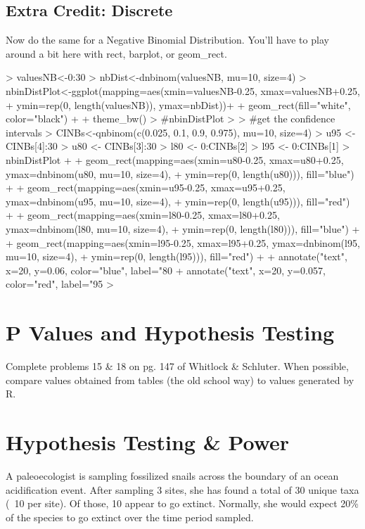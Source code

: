 \documentclass{article}
\begin{document}
\subsection{Extra Credit: Discrete}
Now do the same for a Negative Binomial Distribution.  You'll have to play around a bit here with rect, barplot, or geom\_rect.
\begin{Schunk}
\begin{Sinput}
> valuesNB<-0:30
> nbDist<-dnbinom(valuesNB, mu=10, size=4)
> nbinDistPlot<-ggplot(mapping=aes(xmin=valuesNB-0.25, xmax=valuesNB+0.25,
+                                  ymin=rep(0, length(valuesNB)), ymax=nbDist))+
+                    geom_rect(fill="white", color="black") +
+                     theme_bw()
> #nbinDistPlot
> 
> #get the confidence intervals
> CINBs<-qnbinom(c(0.025, 0.1, 0.9, 0.975), mu=10, size=4)
> u95 <- CINBs[4]:30
> u80 <- CINBs[3]:30
> l80 <- 0:CINBs[2]
> l95 <- 0:CINBs[1]
> nbinDistPlot +
+             geom_rect(mapping=aes(xmin=u80-0.25, xmax=u80+0.25, ymax=dnbinom(u80, mu=10, size=4),
+                                   ymin=rep(0, length(u80))), fill="blue") +
+             geom_rect(mapping=aes(xmin=u95-0.25, xmax=u95+0.25, ymax=dnbinom(u95, mu=10, size=4),
+                                   ymin=rep(0, length(u95))), fill="red") +
+             geom_rect(mapping=aes(xmin=l80-0.25, xmax=l80+0.25, ymax=dnbinom(l80, mu=10, size=4),
+                                   ymin=rep(0, length(l80))), fill="blue") +
+             geom_rect(mapping=aes(xmin=l95-0.25, xmax=l95+0.25, ymax=dnbinom(l95, mu=10, size=4),
+                                   ymin=rep(0, length(l95))), fill="red") +
+             annotate("text", x=20, y=0.06, color="blue", label="80%") +
+             annotate("text", x=20, y=0.057, color="red", label="95%")
> 
\end{Sinput}
\end{Schunk}


\section{P Values and Hypothesis Testing}
  Complete problems 15 \& 18 on pg. 147 of Whitlock \& Schluter.  When possible, compare values obtained from tables (the old school way) to values generated by R.

\section{Hypothesis Testing \& Power}
A paleoecologist is sampling fossilized snails across the boundary of an ocean acidification event.  After sampling 3 sites, she has found a total of 30 unique taxa (~10 per site).  Of those, 10 appear to go extinct.  Normally, she would expect 20\% of the species to go extinct over the time period sampled.
\end{document}
